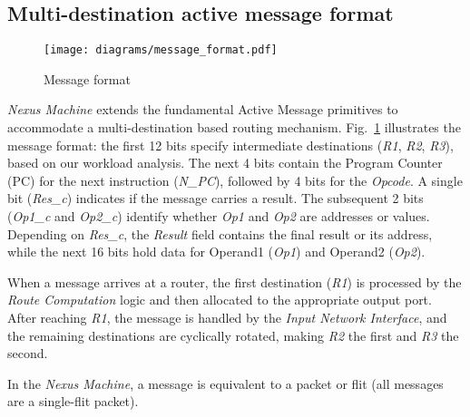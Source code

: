 \subsection{Multi-destination active message format}
\label{section:message_format}
\vspace{-0.7cm}
\begin{figure}[h!]
	\scriptsize
        \centering
    \texttt{[image: diagrams/message\_format.pdf]}
    \vspace{-0.4cm}
	\caption{Message format} 
	\label{fig:message_format}
	\vspace{-.3cm}
\end{figure}
\textit{Nexus Machine} extends the fundamental Active Message primitives to accommodate a multi-destination based routing mechanism. 
Fig.~\ref{fig:message_format} illustrates the message format: the first 12 bits specify intermediate destinations (\textit{R1}, \textit{R2}, \textit{R3}), based on our workload analysis. 
The next 4 bits contain the Program Counter (PC) for the next instruction (\textit{N\_PC}), followed by 4 bits for the \textit{Opcode}. 
A single bit (\textit{Res\_c}) indicates if the message carries a result. 
The subsequent 2 bits (\textit{Op1\_c} and \textit{Op2\_c}) identify whether \textit{Op1} and \textit{Op2} are addresses or values. 
Depending on \textit{Res\_c}, the \textit{Result} field contains the final result or its address, while the next 16 bits hold data for Operand1 (\textit{Op1}) and Operand2 (\textit{Op2}).

When a message arrives at a router, the first destination (\textit{R1}) is processed by the \textit{Route Computation} logic and then allocated to the appropriate output port. After reaching \textit{R1}, the message is handled by the \textit{Input Network Interface}, and the remaining destinations are cyclically rotated, making \textit{R2} the first and \textit{R3} the second. 

In the \textit{Nexus Machine}, a message is equivalent to a packet or flit (all messages are a single-flit packet).
\begin{comment}
\begin{figure*}[h!]
	\scriptsize
	\centering
	\texttt{[image: diagrams/architecture.pdf]}
	\caption{\textit{Nexus Machine} microarchitecture. \textit{Nexus Machine} is a fabric of homogenous PEs interconnected by a mesh network for communicating Active messages, enhancing fabric utilization by executing messages en-route.} 
	\label{fig:detail_arch}
\end{figure*}
\end{comment}
